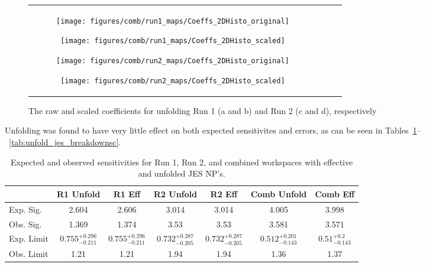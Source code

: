 \begin{figure}[!htbp]\captionsetup{justification=centering}
  \centering
  \begin{tabular}{cccc}
\begin{subfigure}[t]{0.24\textwidth}\centering\texttt{[image: figures/comb/run1\_maps/Coeffs\_2DHisto\_original]}\caption{}\end{subfigure}
\begin{subfigure}[t]{0.24\textwidth}\centering\texttt{[image: figures/comb/run1\_maps/Coeffs\_2DHisto\_scaled]}\caption{}\end{subfigure}
\begin{subfigure}[t]{0.24\textwidth}\centering\texttt{[image: figures/comb/run2\_maps/Coeffs\_2DHisto\_original]}\caption{}\end{subfigure}
\begin{subfigure}[t]{0.24\textwidth}\centering\texttt{[image: figures/comb/run2\_maps/Coeffs\_2DHisto\_scaled]}\caption{}\end{subfigure}
    \end{tabular}
    \caption{The raw and scaled coefficients for unfolding Run 1 (a and b) and Run 2 (c and d), respectively}
    \label{fig:comb_jes_maps}
\end{figure}


Unfolding was found to have very little effect on both expected sensitivites and errors, as can be seen in Tables~\ref{tab:unfold_jes_sensitivities}--~\ref{tab:unfold_jes_breakdownsc}.
\begin{table}[!htbp]\captionsetup{justification=centering}
\begin{center}\begin{tabular}{lcccccc}
\hline\hline
 & R1 Unfold & R1 Eff & R2 Unfold & R2 Eff & Comb Unfold & Comb Eff\\
\hline
Exp. Sig. &  2.604 & 2.606 & 3.014 & 3.014 & 4.005 & 3.998\\
Obs. Sig. & 1.369 & 1.374 & 3.53 & 3.53 & 3.581 & 3.571\\
\hline
Exp. Limit &  $0.755^{+0.296}_{-0.211}$ & $0.755^{+0.296}_{-0.211}$ & $0.732^{+0.287}_{-0.205}$ & $0.732^{+0.287}_{-0.205}$ & $0.512^{+0.201}_{-0.143}$ & $0.51^{+0.2}_{-0.143}$\\
Obs. Limit & 1.21 & 1.21 & 1.94 & 1.94 & 1.36 & 1.37\\
\hline\hline
\end{tabular}
\caption{Expected and observed sensitivities for Run 1, Run 2, and combined workspaces with effective and unfolded JES NP's.}
\label{tab:unfold_jes_sensitivities}
\end{center}
\end{table}

